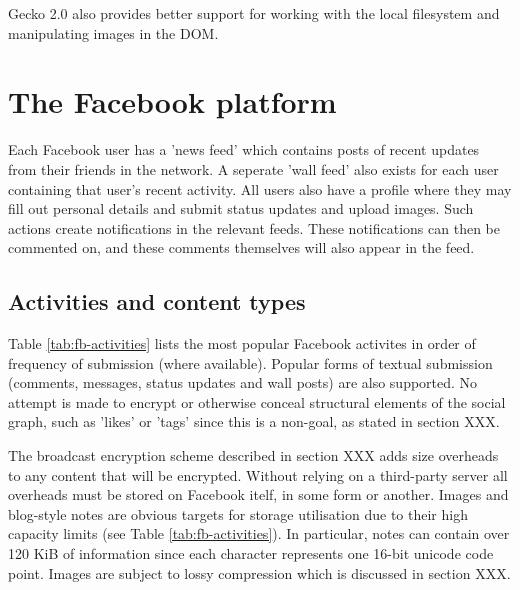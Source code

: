 Gecko 2.0 also provides better support for working with the local filesystem and manipulating images in the \ac{DOM}.


\FloatBarrier
\section{The Facebook platform}

Each Facebook user has a 'news feed' which contains posts of recent updates from their friends in the network. A seperate 'wall feed' also exists for each user containing that user's recent activity. All users also have a profile where they may fill out personal details and submit status updates and upload images. Such actions create notifications in the relevant feeds. These notifications can then be commented on, and these comments themselves will also appear in the feed.


\FloatBarrier
\subsection{Activities and content types}

Table \ref{tab:fb-activities} lists the most popular Facebook activites in order of frequency of submission (where available).  Popular forms of textual submission (comments, messages, status updates and wall posts) are also supported. No attempt is made to encrypt or otherwise conceal structural elements of the social graph, such as 'likes' or 'tags' since this is a non-goal, as stated in section XXX. 

The broadcast encryption scheme described in section XXX adds size overheads to any content that will be encrypted. Without relying on a third-party server all overheads must be stored on Facebook itelf, in some form or another. Images and blog-style notes are obvious targets for storage utilisation due to their high capacity limits (see Table \ref{tab:fb-activities}). In particular, notes can contain over 120 KiB of information since each character represents one 16-bit unicode code point. Images are subject to lossy compression which is discussed in section XXX.

